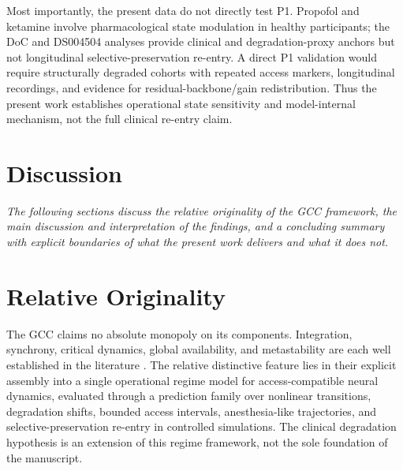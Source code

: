 \documentclass[11pt,a4paper]{article}
\theoremstyle{plain}
\theoremstyle{definition}
\theoremstyle{remark}
\begin{document}
Most importantly, the present data do not directly test P1. Propofol and ketamine involve pharmacological state modulation in healthy participants; the DoC and DS004504 analyses provide clinical and degradation-proxy anchors but not longitudinal selective-preservation re-entry. A direct P1 validation would require structurally degraded cohorts with repeated access markers, longitudinal recordings, and evidence for residual-backbone/gain redistribution. Thus the present work establishes operational state sensitivity and model-internal mechanism, not the full clinical re-entry claim.


\fi
\section*{Discussion}

\noindent\textit{The following sections discuss the relative originality of the GCC framework, the main discussion and interpretation of the findings, and a concluding summary with explicit boundaries of what the present work delivers and what it does not.}

\section{Relative Originality}
\label{sec:originalitaet}

The GCC claims no absolute monopoly on its components. Integration, synchrony, critical dynamics, global availability, and metastability are each well established in the literature \citep{dehaene1998,tononi2004,fries2015,deco2017}. The relative distinctive feature lies in their explicit assembly into a single operational regime model for access-compatible neural dynamics, evaluated through a prediction family over nonlinear transitions, degradation shifts, bounded access intervals, anesthesia-like trajectories, and selective-preservation re-entry in controlled simulations. The clinical degradation hypothesis is an extension of this regime framework, not the sole foundation of the manuscript.

\end{document}
